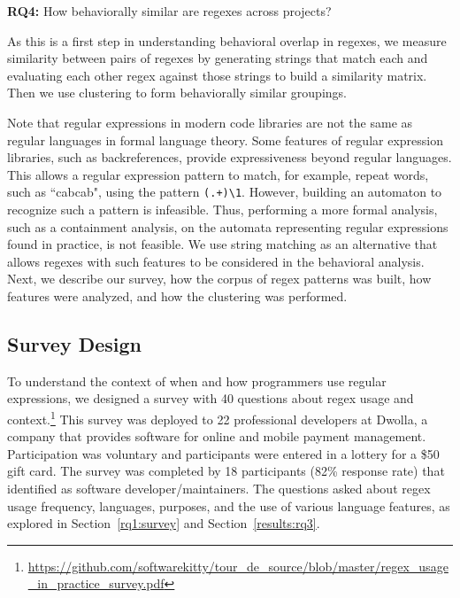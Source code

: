 \noindent \textbf{RQ4:} How behaviorally similar are regexes across projects?

As this is a first step in understanding behavioral overlap in
regexes, we measure similarity between pairs of regexes by generating strings that match each and evaluating each other regex against those strings to build a similarity matrix. Then we use clustering to form behaviorally similar groupings. 

Note that regular expressions in modern code libraries are not the same as regular languages in formal language theory. Some features of regular expression libraries, such as backreferences,  provide expressiveness beyond regular languages. This allows a regular expression pattern to match, for example, repeat words, such as ``cabcab", using the pattern {\tt (.+)\verb!\!1}. However, building an automaton to recognize such a pattern is infeasible. Thus, performing a more formal analysis, such as a containment analysis, on the automata representing regular expressions  found in practice, is not feasible.  We use string matching as an alternative that allows regexes with such features to be considered in the behavioral analysis.\\

%

Next, we describe our survey, how the corpus of regex patterns was built, how features were analyzed, and how the clustering was performed.

\subsection{Survey Design}
\label{study:survey}
To understand the context of when and how programmers use regular expressions, 
we designed a survey with 40 questions about regex usage and context.\footnote{\url{https://github.com/softwarekitty/tour_de_source/blob/master/regex_usage_in_practice_survey.pdf}}  
This survey was deployed to 22 professional developers at Dwolla, a company that provides software for
 online and mobile payment management.
Participation was voluntary and participants were entered in a lottery for a \$50 gift card.
The survey was completed by 18 participants (82\% response rate) that identified as software developer/maintainers. The questions asked about regex usage frequency, languages, purposes, and the use of various language features, as explored in Section~\ref{rq1:survey} and Section~\ref{results:rq3}. 


